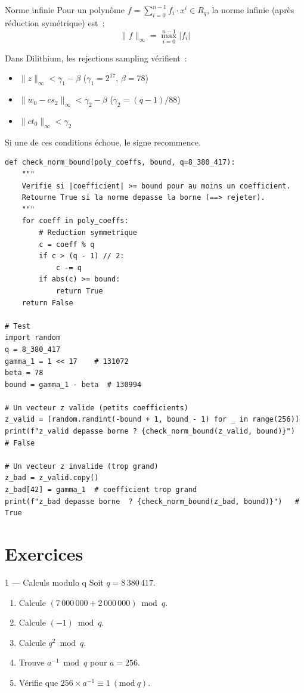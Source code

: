 \documentclass[12pt, a4paper]{article}
\newcommand{\pmod}[1]{\ (\mathrm{mod}\ #1)}
\begin{document}
\begin{defbox}{Norme infinie}
Pour un polynôme $f = \sum_{i=0}^{n-1} f_i \cdot x^i \in R_q$, la norme
infinie (après réduction symétrique) est~:
$$\|f\|_\infty = \max_{i=0}^{n-1} |f_i|$$
\end{defbox}

\begin{importantbox}
Dans Dilithium, les rejections sampling vérifient~:
\begin{itemize}
  \item $\|z\|_\infty < \gamma_1 - \beta$ \hfill ($\gamma_1 = 2^{17}$, $\beta = 78$)
  \item $\|w_0 - cs_2\|_\infty < \gamma_2 - \beta$ \hfill ($\gamma_2 = (q-1)/88$)
  \item $\|ct_0\|_\infty < \gamma_2$
\end{itemize}
Si une de ces conditions échoue, le signe recommence.
\end{importantbox}

\begin{lstlisting}[style=python]
def check_norm_bound(poly_coeffs, bound, q=8_380_417):
    """
    Verifie si |coefficient| >= bound pour au moins un coefficient.
    Retourne True si la norme depasse la borne (==> rejeter).
    """
    for coeff in poly_coeffs:
        # Reduction symmetrique
        c = coeff % q
        if c > (q - 1) // 2:
            c -= q
        if abs(c) >= bound:
            return True
    return False

# Test
import random
q = 8_380_417
gamma_1 = 1 << 17    # 131072
beta = 78
bound = gamma_1 - beta  # 130994

# Un vecteur z valide (petits coefficients)
z_valid = [random.randint(-bound + 1, bound - 1) for _ in range(256)]
print(f"z_valid depasse borne ? {check_norm_bound(z_valid, bound)}")  # False

# Un vecteur z invalide (trop grand)
z_bad = z_valid.copy()
z_bad[42] = gamma_1  # coefficient trop grand
print(f"z_bad depasse borne  ? {check_norm_bound(z_bad, bound)}")   # True
\end{lstlisting}

\section{Exercices}

\begin{exercice}{1 --- Calculs modulo q}
Soit $q = 8\,380\,417$.

\begin{enumerate}[label=\alph*)]
  \item Calcule $(7\,000\,000 + 2\,000\,000) \bmod q$.
  \item Calcule $(-1) \bmod q$.
  \item Calcule $q^2 \bmod q$.
  \item Trouve $a^{-1} \bmod q$ pour $a = 256$.
  \item Vérifie que $256 \times a^{-1} \equiv 1 \pmod{q}$.
\end{enumerate}
\end{exercice}
\end{document}
